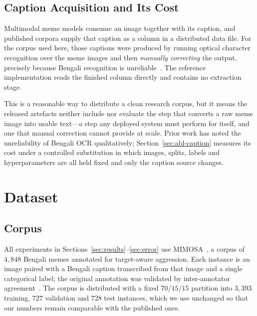 \documentclass[conference]{IEEEtran}
\begin{document}
\subsection{Caption Acquisition and Its Cost}
\label{sec:related-caption}

Multimodal meme models consume an image together with its caption, and published
corpora supply that caption as a column in a distributed data file. For the
corpus used here, those captions were produced by running optical character
recognition over the meme images and then \emph{manually correcting} the output,
precisely because Bengali recognition is unreliable~\cite{ahsan2024,smith2007}.
The reference implementation reads the finished column directly and contains no
extraction stage.

This is a reasonable way to distribute a clean research corpus, but it means the
released artefacts neither include nor evaluate the step that converts a raw
meme image into usable text---a step any deployed system must perform for
itself, and one that manual correction cannot provide at scale. Prior work has
noted the unreliability of Bengali OCR qualitatively; Section~\ref{sec:abl-caption}
measures its cost under a controlled substitution in which images, splits,
labels and hyperparameters are all held fixed and only the caption source
changes.

\section{Dataset}
\label{sec:dataset}

\subsection{Corpus}

All experiments in Sections~\ref{sec:results}--\ref{sec:error} use
MIMOSA~\cite{ahsan2024}, a corpus of $4{,}848$ Bengali memes annotated for
target-aware aggression. Each instance is an image paired with a Bengali caption
transcribed from that image and a single categorical label; the original
annotation was validated by inter-annotator agreement~\cite{cohen1960}. The corpus is
distributed with a fixed $70/15/15$ partition into $3{,}393$ training, $727$
validation and $728$ test instances, which we use unchanged so that our numbers
remain comparable with the published ones.
\end{document}
